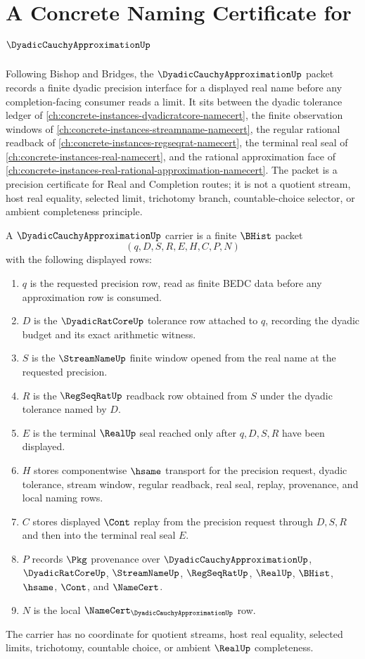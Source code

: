 \chapter{A Concrete Naming Certificate for $\DyadicCauchyApproximationUp$}
\label{ch:concrete-instances-dyadic-cauchy-approximation-namecert}

Following Bishop and Bridges, the $\DyadicCauchyApproximationUp$ packet records a finite dyadic precision interface for a displayed real name before any completion-facing consumer reads a limit. It sits between the dyadic tolerance ledger of \autoref{ch:concrete-instances-dyadicratcore-namecert}, the finite observation windows of \autoref{ch:concrete-instances-streamname-namecert}, the regular rational readback of \autoref{ch:concrete-instances-regseqrat-namecert}, the terminal real seal of \autoref{ch:concrete-instances-real-namecert}, and the rational approximation face of \autoref{ch:concrete-instances-real-rational-approximation-namecert}. The packet is a precision certificate for Real and Completion routes; it is not a quotient stream, host real equality, selected limit, trichotomy branch, countable-choice selector, or ambient completeness principle.

\begin{definition}
\label{def:dyadic-cauchy-approximation-carrier}
A $\DyadicCauchyApproximationUp$ carrier is a finite $\BHist$ packet
$$
(q,D,S,R,E,H,C,P,N)
$$
with the following displayed rows:
\begin{enumerate}
\item $q$ is the requested precision row, read as finite BEDC data before any approximation row is consumed.
\item $D$ is the $\DyadicRatCoreUp$ tolerance row attached to $q$, recording the dyadic budget and its exact arithmetic witness.
\item $S$ is the $\StreamNameUp$ finite window opened from the real name at the requested precision.
\item $R$ is the $\RegSeqRatUp$ readback row obtained from $S$ under the dyadic tolerance named by $D$.
\item $E$ is the terminal $\RealUp$ seal reached only after $q,D,S,R$ have been displayed.
\item $H$ stores componentwise $\hsame$ transport for the precision request, dyadic tolerance, stream window, regular readback, real seal, replay, provenance, and local naming rows.
\item $C$ stores displayed $\Cont$ replay from the precision request through $D,S,R$ and then into the terminal real seal $E$.
\item $P$ records $\Pkg$ provenance over $\DyadicCauchyApproximationUp$, $\DyadicRatCoreUp$, $\StreamNameUp$, $\RegSeqRatUp$, $\RealUp$, $\BHist$, $\hsame$, $\Cont$, and $\NameCert$.
\item $N$ is the local $\NameCert_{\DyadicCauchyApproximationUp}$ row.
\end{enumerate}
The carrier has no coordinate for quotient streams, host real equality, selected limits, trichotomy, countable choice, or ambient $\RealUp$ completeness.
\end{definition}

